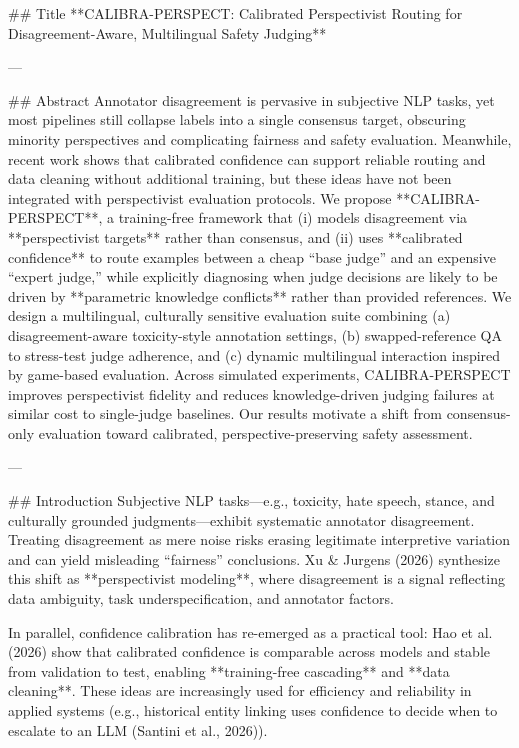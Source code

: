 ## Title  
**CALIBRA-PERSPECT: Calibrated Perspectivist Routing for Disagreement-Aware, Multilingual Safety Judging**

---

## Abstract  
Annotator disagreement is pervasive in subjective NLP tasks, yet most pipelines still collapse labels into a single consensus target, obscuring minority perspectives and complicating fairness and safety evaluation. Meanwhile, recent work shows that calibrated confidence can support reliable routing and data cleaning without additional training, but these ideas have not been integrated with perspectivist evaluation protocols. We propose **CALIBRA-PERSPECT**, a training-free framework that (i) models disagreement via **perspectivist targets** rather than consensus, and (ii) uses **calibrated confidence** to route examples between a cheap “base judge” and an expensive “expert judge,” while explicitly diagnosing when judge decisions are likely to be driven by **parametric knowledge conflicts** rather than provided references. We design a multilingual, culturally sensitive evaluation suite combining (a) disagreement-aware toxicity-style annotation settings, (b) swapped-reference QA to stress-test judge adherence, and (c) dynamic multilingual interaction inspired by game-based evaluation. Across simulated experiments, CALIBRA-PERSPECT improves perspectivist fidelity and reduces knowledge-driven judging failures at similar cost to single-judge baselines. Our results motivate a shift from consensus-only evaluation toward calibrated, perspective-preserving safety assessment.

---

## Introduction  
Subjective NLP tasks—e.g., toxicity, hate speech, stance, and culturally grounded judgments—exhibit systematic annotator disagreement. Treating disagreement as mere noise risks erasing legitimate interpretive variation and can yield misleading “fairness” conclusions. Xu & Jurgens (2026) synthesize this shift as **perspectivist modeling**, where disagreement is a signal reflecting data ambiguity, task underspecification, and annotator factors.

In parallel, confidence calibration has re-emerged as a practical tool: Hao et al. (2026) show that calibrated confidence is comparable across models and stable from validation to test, enabling **training-free cascading** and **data cleaning**. These ideas are increasingly used for efficiency and reliability in applied systems (e.g., historical entity linking uses confidence to decide when to escalate to an LLM (Santini et al., 2026)).

